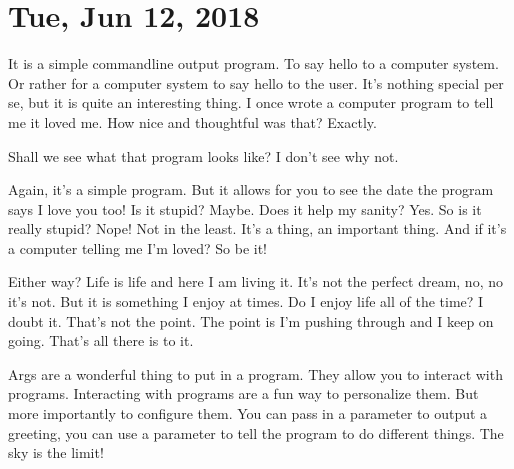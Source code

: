 \section{Tue, Jun 12, 2018}



It is a simple commandline output program. To say hello to a computer system. Or
rather for a computer system to say hello to the user. It's nothing special per
se, but it is quite an interesting thing. I once wrote a computer program to
tell me it loved me. How nice and thoughtful was that? Exactly.

Shall we see what that program looks like? I don't see why not.



Again, it's a simple program. But it allows for you to see the date the program
says I love you too! Is it stupid? Maybe. Does it help my sanity? Yes. So is it
really stupid? Nope! Not in the least. It's a thing, an important thing. And if
it's a computer telling me I'm loved? So be it!

Either way? Life is life and here I am living it. It's not the perfect dream,
no, no it's not. But it is something I enjoy at times. Do I enjoy life all of
the time? I doubt it. That's not the point. The point is I'm pushing through and
I keep on going. That's all there is to it.

Args are a wonderful thing to put in a program. They allow you to interact with
programs. Interacting with programs are a fun way to personalize them. But more
importantly to configure them. You can pass in a parameter to output a greeting,
you can use a parameter to tell the program to do different things. The sky is
the limit!


